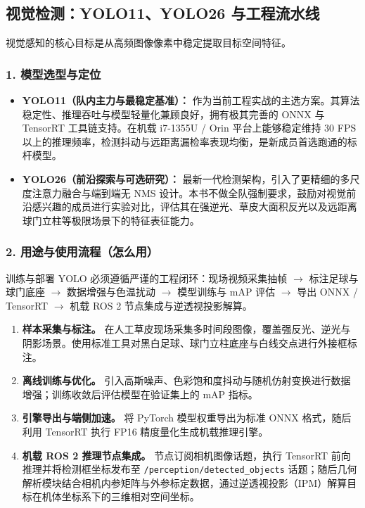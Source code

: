 \subsection{视觉检测：YOLO11、YOLO26 与工程流水线}

视觉感知的核心目标是从高频图像像素中稳定提取目标空间特征。

\subsubsection{1. 模型选型与定位}
\begin{itemize}[leftmargin=*]
    \item \textbf{YOLO11（队内主力与最稳定基准）：} 作为当前工程实战的主选方案。其算法稳定性、推理吞吐与模型轻量化兼顾良好，拥有极其完善的 ONNX 与 TensorRT 工具链支持。在机载 i7-1355U / Orin 平台上能够稳定维持 30 FPS 以上的推理频率，检测抖动与远距离漏检率表现均衡，是新成员首选跑通的标杆模型。
    \item \textbf{YOLO26（前沿探索与可选研究）：} 最新一代检测架构，引入了更精细的多尺度注意力融合与端到端无 NMS 设计。本书不做全队强制要求，鼓励对视觉前沿感兴趣的成员进行实验对比，评估其在强逆光、草皮大面积反光以及远距离球门立柱等极限场景下的特征表征能力。
\end{itemize}

\subsubsection{2. 用途与使用流程（怎么用）}
训练与部署 YOLO 必须遵循严谨的工程闭环：现场视频采集抽帧 $\rightarrow$ 标注足球与球门底座 $\rightarrow$ 数据增强与色温扰动 $\rightarrow$ 模型训练与 mAP 评估 $\rightarrow$ 导出 ONNX / TensorRT $\rightarrow$ 机载 ROS 2 节点集成与逆透视投影解算。

\begin{enumerate}[leftmargin=*]
    \item \textbf{样本采集与标注。} 在人工草皮现场采集多时间段图像，覆盖强反光、逆光与阴影场景。使用标准工具对黑白足球、球门立柱底座与白线交点进行外接框标注。
    \item \textbf{离线训练与优化。} 引入高斯噪声、色彩饱和度抖动与随机仿射变换进行数据增强；训练收敛后评估模型在验证集上的 mAP 指标。
    \item \textbf{引擎导出与端侧加速。} 将 PyTorch 模型权重导出为标准 ONNX 格式，随后利用 TensorRT 执行 FP16 精度量化生成机载推理引擎。
    \item \textbf{机载 ROS 2 推理节点集成。} 节点订阅相机图像话题，执行 TensorRT 前向推理并将检测框坐标发布至 \texttt{/perception/detected\_objects} 话题；随后几何解析模块结合相机内参矩阵与外参标定数据，通过逆透视投影（IPM）解算目标在机体坐标系下的三维相对空间坐标。
\end{enumerate}

